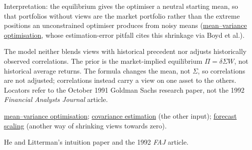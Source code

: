 \begin{qfmodel}
 Interpretation: the equilibrium gives the optimiser a neutral starting mean, so that portfolios without views are the market portfolio rather than the extreme positions an unconstrained optimiser produces from noisy means (\hyperref[mod:mean-variance-portfolio-optimisation]{mean--variance optimisation}, whose estimation-error pitfall cites this shrinkage via Boyd et al.).

 The model neither blends views with historical precedent nor adjusts historically observed correlations. The prior is the market-implied equilibrium $\Pi=\delta\Sigma W$, not historical average returns. The formula changes the mean, not $\Sigma$, so correlations are not adjusted; correlations instead carry a view on one asset to the others. Locators refer to the October 1991 Goldman Sachs research paper, not the 1992 \emph{Financial Analysts Journal} article.

 \hyperref[mod:mean-variance-portfolio-optimisation]{mean--variance optimisation}; \hyperref[meth:portfolio-covariance-estimation]{covariance estimation} (the other input); \hyperref[meth:forecast-scaling-ic]{forecast scaling} (another way of shrinking views towards zero).

 He and Litterman's intuition paper and the 1992 \emph{FAJ} article.

\end{qfmodel}
